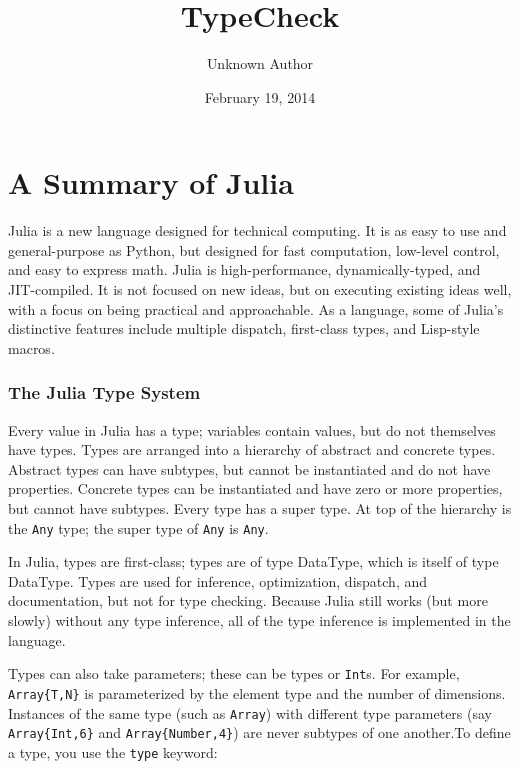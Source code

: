 \documentclass[letterpaper,10pt,english]{/Users/danluu/anaconda/lib/python2.7/site-packages/sphinx/texinputs/sphinxhowto}
\title{TypeCheck}
\date{February 19, 2014}
\author{Unknown Author}
\begin{document}
        
            \maketitle
        

        


        
        \part{A Summary of Julia}Julia is a new language designed for technical computing. It is as easy
to use and general-purpose as Python, but designed for fast computation,
low-level control, and easy to express math. Julia is high-performance,
dynamically-typed, and JIT-compiled. It is not focused on new ideas, but
on executing existing ideas well, with a focus on being practical and
approachable. As a language, some of Julia's distinctive features
include multiple dispatch, first-class types, and Lisp-style macros.\section{The Julia Type System}Every value in Julia has a type; variables contain values, but do not
themselves have types. Types are arranged into a hierarchy of abstract
and concrete types. Abstract types can have subtypes, but cannot be
instantiated and do not have properties. Concrete types can be
instantiated and have zero or more properties, but cannot have subtypes.
Every type has a super type. At top of the hierarchy is the \texttt{Any}
type; the super type of \texttt{Any} is \texttt{Any}.

In Julia, types are first-class; types are of type DataType, which is
itself of type DataType. Types are used for inference, optimization,
dispatch, and documentation, but not for type checking. Because Julia
still works (but more slowly) without any type inference, all of the
type inference is implemented in the language.

Types can also take parameters; these can be types or \texttt{Int}s. For
example, \texttt{Array\{T,N\}} is parameterized by the element type and
the number of dimensions. Instances of the same type (such as
\texttt{Array}) with different type parameters (say
\texttt{Array\{Int,6\}} and \texttt{Array\{Number,4\}}) are never
subtypes of one another.To define a type, you use the \texttt{type} keyword:

\end{document}
